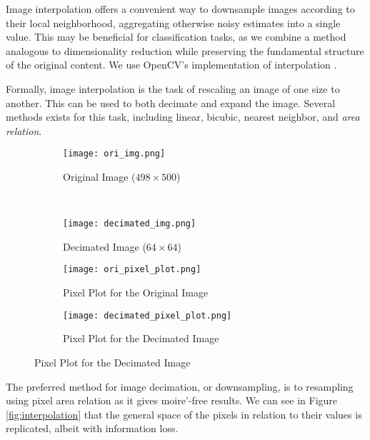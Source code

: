 \documentclass{article}
\begin{document}
Image interpolation offers a convenient way to downsample images according to
their local neighborhood, aggregating otherwise noisy estimates into a single
value. This may be beneficial for classification tasks, as we combine a method
analogous to dimensionality reduction while preserving the fundamental structure of
the original content. We use OpenCV's implementation of interpolation \cite{opencv}.

Formally, image interpolation is the task of rescaling an image of one size
to another. This can be used to both decimate and expand the image. Several
methods exists for this task, including linear, bicubic, nearest neighbor, and
\textit{area relation}.

\begin{figure}[h!]
  \centering
  \caption{Results of Interpolating a 249,000 pixel image to a 4,096 pixel image.}
  \label{fig:interpolation}
  \begin{subfigure}[b]{0.45\textwidth}
    \centering
    \texttt{[image: ori\_img.png]}
    \vspace{-13pt}
    \caption{Original Image ($498 \times 500$)}
    \label{fig:ori-image}
  \end{subfigure}
  ~
  \begin{subfigure}[b]{0.45\textwidth}
    \centering
    \texttt{[image: decimated\_img.png]}
    \vspace{-13pt}
    \caption{Decimated Image ($64 \times 64$)}
    \label{fig:reduced-img}
  \end{subfigure}

  \begin{subfigure}[b]{0.45\textwidth}
    \centering
    \texttt{[image: ori\_pixel\_plot.png]}
    \caption{Pixel Plot for the Original Image}
    \label{fig:ori-pixel-plot}
  \end{subfigure}
  \begin{subfigure}[b]{0.45\textwidth}
    \centering
    \texttt{[image: decimated\_pixel\_plot.png]}
    \caption{Pixel Plot for the Decimated Image}
    \label{fig:reduced-pixel-plot}
  \end{subfigure}
\end{figure}

The preferred method for image decimation, or downsampling, is to
resampling using pixel area relation as it gives moire'-free results. We can
see in Figure \ref{fig:interpolation} that the general space of the pixels in
relation to their values is replicated, albeit with information loss.
\end{document}
